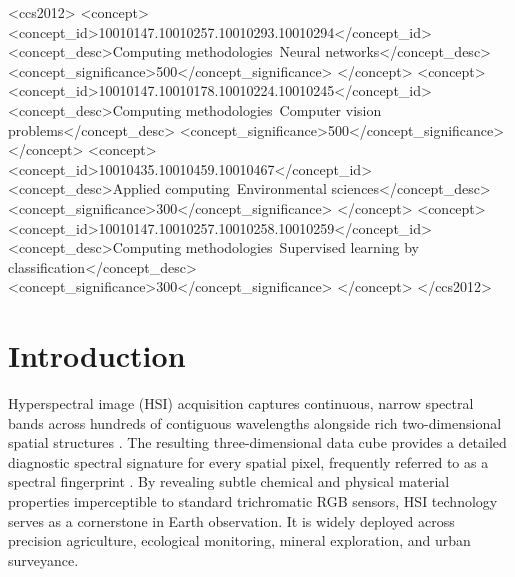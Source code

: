 \documentclass[manuscript,screen,review]{acmart}
\begin{document}
\begin{CCSXML}
<ccs2012>
 <concept>
  <concept_id>10010147.10010257.10010293.10010294</concept_id>
  <concept_desc>Computing methodologies~Neural networks</concept_desc>
  <concept_significance>500</concept_significance>
 </concept>
 <concept>
  <concept_id>10010147.10010178.10010224.10010245</concept_id>
  <concept_desc>Computing methodologies~Computer vision problems</concept_desc>
  <concept_significance>500</concept_significance>
 </concept>
 <concept>
  <concept_id>10010435.10010459.10010467</concept_id>
  <concept_desc>Applied computing~Environmental sciences</concept_desc>
  <concept_significance>300</concept_significance>
 </concept>
 <concept>
  <concept_id>10010147.10010257.10010258.10010259</concept_id>
  <concept_desc>Computing methodologies~Supervised learning by classification</concept_desc>
  <concept_significance>300</concept_significance>
 </concept>
</ccs2012>
\end{CCSXML}





\maketitle


\section{Introduction}
\label{sec:intro}
Hyperspectral image (HSI) acquisition captures continuous, narrow spectral bands across hundreds of contiguous wavelengths alongside rich two-dimensional spatial structures \cite{bioucas2012hyperspectral, plaza2009recent}. The resulting three-dimensional data cube provides a detailed diagnostic spectral signature for every spatial pixel, frequently referred to as a spectral fingerprint \cite{fauvel2012advances, ghamisi2017advanced}. By revealing subtle chemical and physical material properties imperceptible to standard trichromatic RGB sensors, HSI technology serves as a cornerstone in Earth observation. It is widely deployed across precision agriculture, ecological monitoring, mineral exploration, and urban surveyance.
\end{document}
